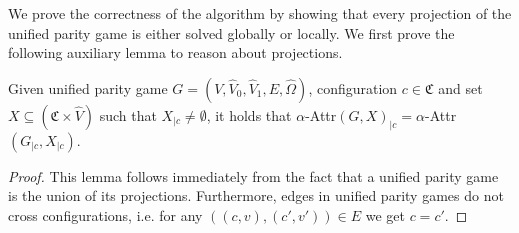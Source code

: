 We prove the correctness of the algorithm by showing that every projection of the unified parity game is either solved globally or locally. We first prove the following auxiliary lemma to reason about projections.

\begin{lemma}
	\label{lem_projected_attr_is_attr_of_projected}
	Given unified parity game $G = (V,\hat{V}_0,\hat{V}_1,E,\hat{\Omega})$, configuration $c \in \mathfrak{C}$ and set $X \subseteq (\mathfrak{C} \times \hat{V})$ such that $X_{|c} \neq \emptyset$, it holds that $\alpha$-Attr$(G,X)_{|c}= \alpha$-Attr$(G_{|c},X_{|c})$.
	\begin{proof}
		This lemma follows immediately from the fact that a unified parity game is the union of its projections. Furthermore, edges in unified parity games do not cross configurations, i.e. for any $((c,v),(c',v')) \in E$ we get $c = c'$.
	\end{proof}
\end{lemma}
